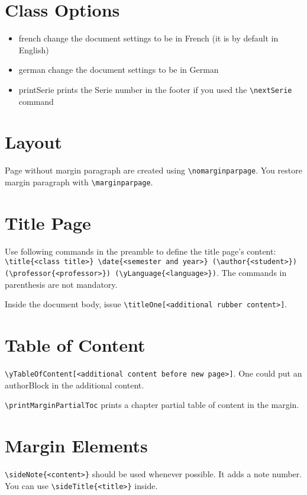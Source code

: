 \documentclass[a4paper, 11pt, oneside, fleqn]{article}
\begin{document}
	
	\begin{multicols}{2}
		\section{Class Options}
		\begin{itemize}
			\item french change the document settings to be in French (it is by default in English)
			\item german change the document settings to be in German
			\item printSerie prints the Serie number in the footer if you used the \lstinline|\nextSerie| command
		\end{itemize}
		
		
		\section{Layout}
		Page without margin paragraph are created using \lstinline|\nomarginparpage|. You restore margin paragraph with \lstinline|\marginparpage|.
		
		
		\section{Title Page}
		Use following commands in the preamble to define the title page's content: \lstinline[breaklines]|\title{<class title>} \date{<semester and year>} (\author{<student>}) (\professor{<professor>}) (\yLanguage{<language>})|. The commands in parenthesis are not mandatory.
		
		Inside the document body, issue \lstinline|\titleOne[<additional rubber content>]|.
		
		
		\section{Table of Content}
		\lstinline[breaklines]|\yTableOfContent[<additional content before new page>]|. One could put an authorBlock in the additional content.
		
		\lstinline[breaklines]|\printMarginPartialToc| prints a chapter partial table of content in the margin.
		
		
		\section{Margin Elements}
		\lstinline[breaklines]|\sideNote{<content>}| should be used whenever possible. It adds a note number. You can use \lstinline[breaklines]|\sideTitle{<title>}| inside.
		

\end{multicols}
\end{document}
